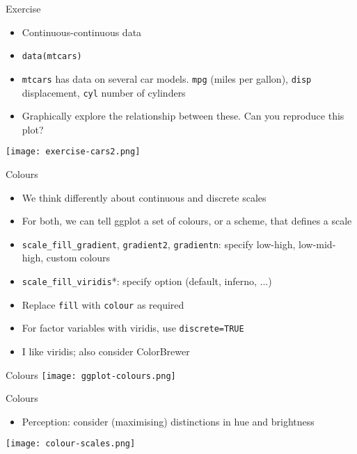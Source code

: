 \documentclass[10pt]{beamer}
\begin{document}
\begin{frame}{Exercise}
  \begin{itemize}
  \item Continuous-continuous data
    \item[] \texttt{data(mtcars)}
    \item \texttt{mtcars} has data on several car models. \texttt{mpg} (miles per gallon), \texttt{disp} displacement, \texttt{cyl} number of cylinders
     \item Graphically explore the relationship between these. Can you reproduce this plot?
  \end{itemize}
  \texttt{[image: exercise-cars2.png]}
\end{frame}

\begin{frame}{Colours}
   \begin{itemize}
   \item We think differently about continuous and discrete scales
   \item For both, we can tell ggplot a set of colours, or a scheme, that defines a scale
     \item \texttt{scale\_fill\_gradient}, \texttt{gradient2}, \texttt{gradientn}: specify low-high, low-mid-high, custom colours
     \item \texttt{scale\_fill\_viridis}*: specify option (default, inferno, ...)
     \item Replace \texttt{fill} with \texttt{colour} as required
     \item For factor variables with viridis, use \texttt{discrete=TRUE}
       \item I like viridis; also consider ColorBrewer
     \end{itemize}
\end{frame}

\begin{frame}{Colours}
  \texttt{[image: ggplot-colours.png]}
\end{frame}

\begin{frame}{Colours}
   \begin{itemize}
   \item Perception: consider (maximising) distinctions in hue and brightness
     \end{itemize}
   \texttt{[image: colour-scales.png]}
\end{frame}
\end{document}
